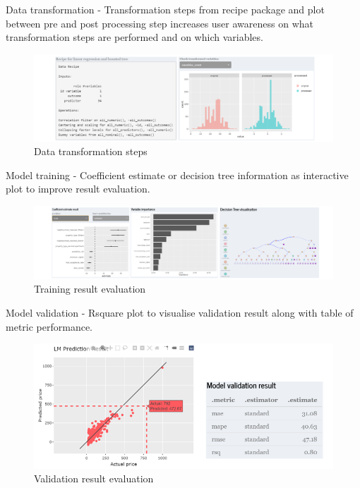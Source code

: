 \documentclass{acm_proc_article-sp}
\begin{document}
Data transformation - Transformation steps from recipe package and plot
between pre and post processing step increases user awareness on what
transformation steps are performed and on which variables.

\begin{figure}[H]

{\centering \includegraphics[width=1\linewidth]{images/recipetrf} 

}

\caption{Data transformation steps}\label{fig:unnamed-chunk-11}
\end{figure}

Model training - Coefficient estimate or decision tree information as
interactive plot to improve result evaluation.

\begin{figure}[H]

{\centering \includegraphics[width=1\linewidth]{images/mdltrn} 

}

\caption{Training result evaluation}\label{fig:unnamed-chunk-12}
\end{figure}

Model validation - Rsquare plot to visualise validation result along
with table of metric performance.

\begin{figure}[H]

{\centering \includegraphics[width=1\linewidth]{images/mdleval} 

}

\caption{Validation result evaluation}\label{fig:unnamed-chunk-13}
\end{figure}
\end{document}
